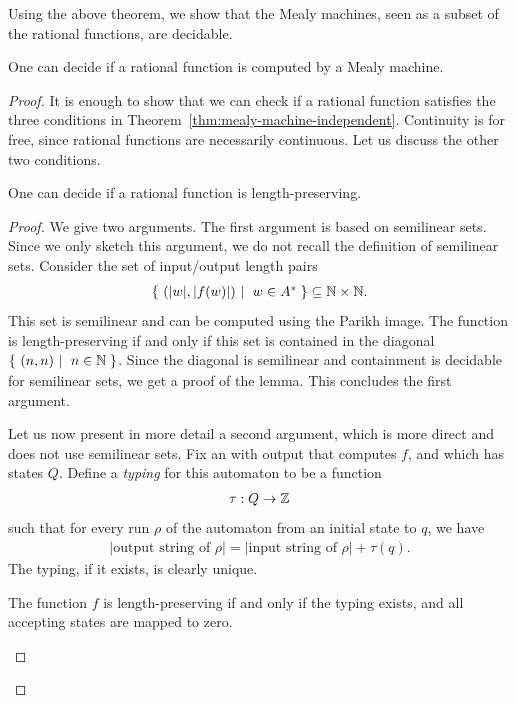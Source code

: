 Using the above theorem, we show that the Mealy machines, seen as a subset of the rational functions, are decidable. 
\begin{theorem}\label{thm:decide-if-mealy}
    One can decide if a rational function is computed by a Mealy machine.
\end{theorem}

\begin{proof}
    It is enough to show that we can check if a rational function satisfies the three conditions in Theorem~\ref{thm:mealy-machine-independent}. Continuity is for free, since rational functions are necessarily continuous. Let us discuss the other two conditions.

    \begin{lemma}\label{lem:decide-if-length-preserving}
        One can decide if a rational function is length-preserving.
    \end{lemma}

    \begin{proof} We give two arguments. The first argument is based on semilinear sets. Since we only sketch this argument, we do not recall the definition of semilinear sets. Consider the set of input/output length pairs
        \begin{align*}
        \setbuild{ (|w|,|f(w)|)}{ $w \in A^*$} \subseteq \Nat \times \Nat.
        \end{align*}
        This set is semilinear and can be computed using the Parikh image. The function is length-preserving if and only if this set is contained in the diagonal $\setbuild{(n,n)}{$n \in \Nat$}$. Since the diagonal is semilinear and containment is decidable for semilinear sets, we get a proof of the lemma. This concludes the first argument. 

        Let us now present in more detail a second argument, which is more direct and does not use semilinear sets.
        Fix an \nfa with output that computes $f$, and which has states $Q$.  Define a \emph{typing} for this automaton to be a function 
        \begin{align*}
        \tau : Q \to {\mathbb Z}
        \end{align*}
        such that for every run $\rho$ of the automaton from an initial state to $q$, we have 
        \begin{align*}
        |\text{output string of $\rho$}| = |\text{input string of $\rho$}| + \tau(q).
        \end{align*}
        The typing, if it exists, is clearly unique.
        \begin{claim}\label{claim:typing-length-preserving}
            The function $f$ is length-preserving if and only if the typing exists, and all accepting states are mapped to zero. 
        \end{claim}


\end{proof}
\end{proof}
